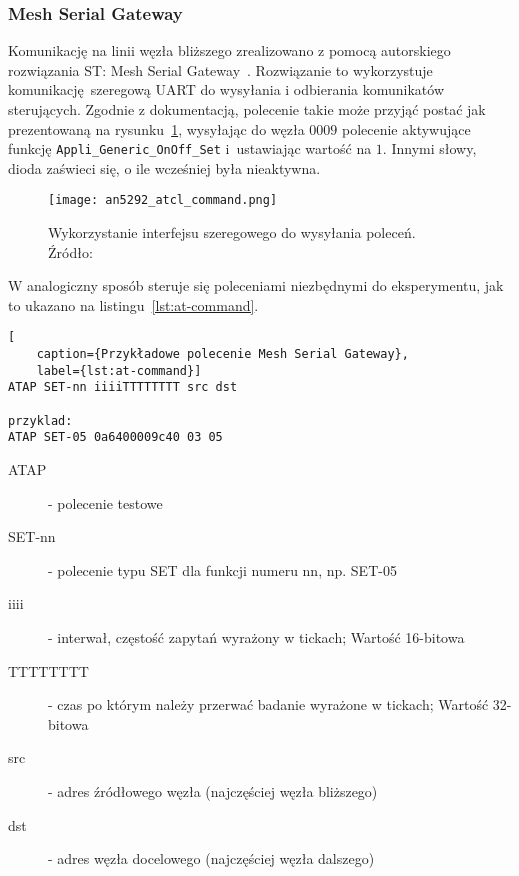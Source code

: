 \subsubsection{Mesh Serial Gateway}\label{mesh:serial-gateway}
Komunikację na linii węzła bliższego zrealizowano z pomocą autorskiego rozwiązania ST: Mesh Serial Gateway~\cite{st_an5292_2021}.
Rozwiązanie to wykorzystuje komunikację szeregową \gls{UART} do wysyłania i odbierania komunikatów sterujących.
Zgodnie z dokumentacją, polecenie takie może przyjąć postać jak prezentowaną na rysunku~\ref{an5292_atcl_command}, wysyłając do węzła $0009$
polecenie aktywujące funkcję \texttt{Appli\_Generic\_OnOff\_Set} i~ustawiając wartość na $1$. Innymi słowy, dioda zaświeci
się, o ile wcześniej była nieaktywna.

\begin{figure}[!htb]
	\centering \texttt{[image: an5292\_atcl\_command.png]}
	\caption{Wykorzystanie interfejsu szeregowego do wysyłania poleceń. Źródło:~\cite{st_an5292_2021}}
	\label{an5292_atcl_command}
\end{figure}

W analogiczny sposób steruje się poleceniami niezbędnymi do eksperymentu, jak to ukazano na listingu~\ref{lst:at-command}.
\begin{lstlisting}[
    caption={Przykładowe polecenie Mesh Serial Gateway},
    label={lst:at-command}]
ATAP SET-nn iiiiTTTTTTTT src dst

przyklad:
ATAP SET-05 0a6400009c40 03 05
\end{lstlisting}

\begin{description}
\item [ATAP] - polecenie testowe
\item [SET-nn] - polecenie typu SET dla funkcji numeru nn, np. SET-05
\item [iiii] - interwał, częstość zapytań wyrażony w tickach; Wartość 16-bitowa
\item [TTTTTTTT] - czas po którym należy przerwać badanie wyrażone w tickach; Wartość 32-bitowa
\item [src] - adres źródłowego węzła (najczęściej węzła bliższego)
\item [dst] - adres węzła docelowego (najczęściej węzła dalszego)
\end{description}


